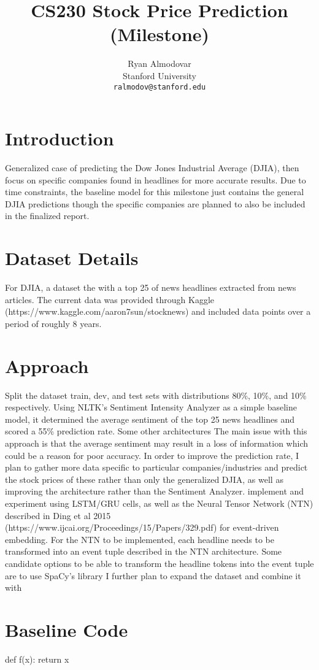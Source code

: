 \documentclass{article} %
\title{CS230 Stock Price Prediction (Milestone)}
\author{
Ryan Almodovar \\
Stanford University\\
\texttt{ralmodov@stanford.edu} \\
}
\begin{document}
\maketitle


\section{Introduction}
Generalized case of predicting the Dow Jones Industrial Average (DJIA), then focus on specific companies found in headlines
for more accurate results.
Due to time constraints, the baseline model for this milestone just contains the general DJIA predictions though the
specific companies are planned to also be included in the finalized report.

\section{Dataset Details}
For DJIA, a dataset the with a top 25 of news headlines extracted from news articles.
The current data was provided through Kaggle (https://www.kaggle.com/aaron7sun/stocknews) and included data points over a period of roughly 8 years.

\section{Approach}
Split the dataset train, dev, and test sets with distributions 80\%, 10\%, and 10\% respectively.
Using NLTK's Sentiment Intensity Analyzer as a simple baseline model, it determined the average sentiment of the top 25 news headlines and scored a 55\% prediction rate. 
Some other architectures 
The main issue with this approach is that the average sentiment may result in a loss of information which could be a reason for poor accuracy.
In order to improve the prediction rate, I plan to gather more data specific to particular companies/industries and predict the stock prices of these rather than only the generalized DJIA, as well as improving the architecture rather than the Sentiment Analyzer.
implement and experiment using LSTM/GRU cells, as well as the Neural Tensor Network (NTN) described in Ding et al 2015 (https://www.ijcai.org/Proceedings/15/Papers/329.pdf) for event-driven embedding.
For the NTN to be implemented, each headline needs to be transformed into an event tuple described in the NTN architecture.
Some candidate options to be able to transform the headline tokens into the event tuple are to use SpaCy's library
I further plan to expand the dataset and combine it with 

\section{Baseline Code}
\begin{python}
def f(x):
    return x
\end{python}
\end{document}
